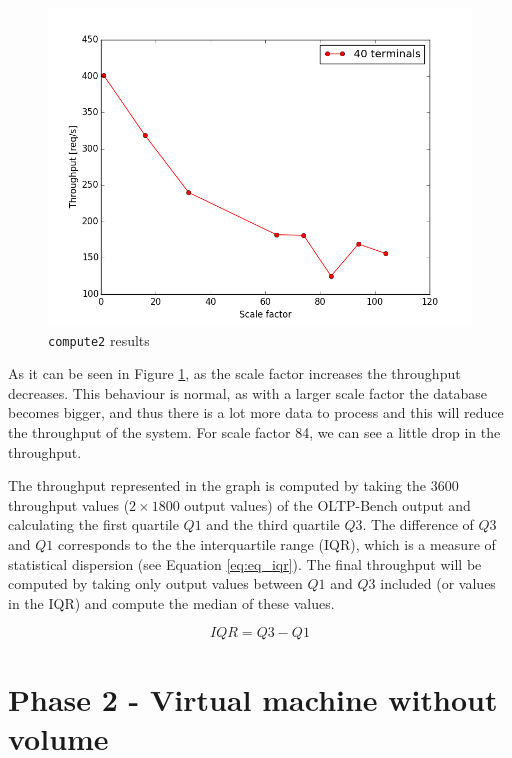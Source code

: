 \begin{figure}[h]
	\centering
	\includegraphics[scale=0.5]{figures/results/ph115_t40.png}
	\caption{\texttt{compute2} results}
	\label{fig:ph115_t40}
\end{figure}

As it can be seen in Figure \ref{fig:ph115_t40}, as the scale factor increases the throughput decreases. 
This behaviour is normal, as with a larger scale factor the database becomes bigger, and thus there is a lot more data to process and this will reduce the throughput of the system. 
For scale factor 84, we can see a little drop in the throughput. 

The throughput represented in the graph is computed by taking the 3600 throughput values ($2\times1800$ output values) of the OLTP-Bench output and calculating the first quartile $Q1$ and the third quartile $Q3$. 
The difference of $Q3$ and $Q1$ corresponds to the the interquartile range (IQR), which is a measure of statistical dispersion (see Equation \ref{eq:eq_iqr}). 
The final throughput will be computed by taking only output values between $Q1$ and $Q3$ included (or values in the IQR) and compute the median of these values.

\begin{equation}
   IQR = Q3 - Q1
   \label{eq:eq_iqr}
\end{equation}





\section{Phase 2 - Virtual machine without volume}
\label{section:phase2}

